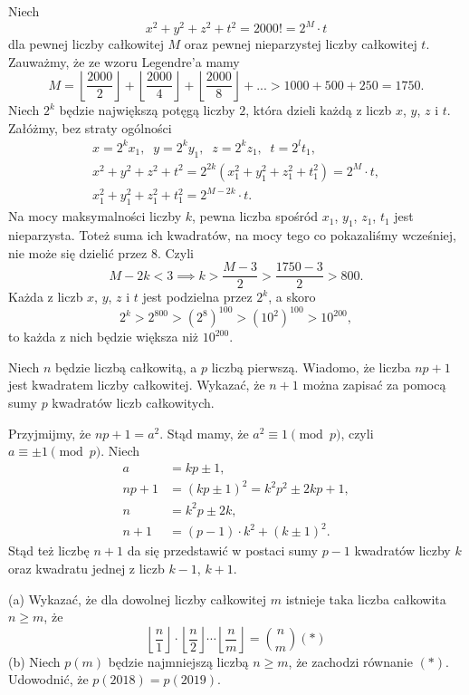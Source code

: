 \vspace{10px}
\noindent
Niech
\[
	x^2 + y^2 + z^2 + t^2 = 2000! = 2^M \cdot t
\]
dla pewnej liczby całkowitej $M$ oraz pewnej nieparzystej liczby całkowitej $t$. Zauważmy, że ze wzoru Legendre'a mamy
\[
	M = \left\lfloor \frac{2000}{2} \right\rfloor + \left\lfloor \frac{2000}{4} \right\rfloor + \left\lfloor \frac{2000}{8} \right\rfloor + ... > 1000 + 500 + 250 = 1750.
\]
Niech $2^k$ będzie największą potęgą liczby $2$, która dzieli każdą z liczb $x$, $y$, $z$ i $t$. Załóżmy, bez straty ogólności
\begin{gather*}
	x = 2^{k}x_1, \;\; y = 2^{k}y_1, \;\; z = 2^{k}z_1, \;\; t = 2^{l}t_1, \\
	x^2 + y^2 + z^2 + t^2 = 2^{2k} \left(x_1^2 + y_1^2 + z_1^2 + t_1^2\right) = 2^M \cdot t, \\
	x_1^2 + y_1^2 + z_1^2 + t_1^2 = 2^{M - 2k} \cdot t.
\end{gather*}
Na mocy maksymalności liczby $k$, pewna liczba spośród $x_1$, $y_1$, $z_1$, $t_1$ jest nieparzysta. Toteż suma ich kwadratów, na mocy tego co pokazaliśmy wcześniej, nie może się dzielić przez $8$. Czyli
\[
 M - 2k < 3 \implies k > \frac{M - 3}{2} > \frac{1750 - 3}{2} > 800.
\]
Każda z liczb $x$, $y$, $z$ i $t$ jest podzielna przez $2^{k}$, a skoro
\[
	2^k > 2^{800} > \left(2^{8}\right)^{100} > \left(10^{2}\right)^{100} > 10^{200},
\]
to każda z nich będzie większa niż $10^{200}$.
\vspace{5px}

\begin{problem}{5}
	Niech $n$ będzie liczbą całkowitą, a $p$ liczbą pierwszą. Wiadomo, że liczba $np + 1$ jest kwadratem liczby całkowitej. Wykazać, że $n + 1$ można zapisać za pomocą sumy $p$ kwadratów liczb całkowitych.
\end{problem}

\noindent
Przyjmijmy, że $np + 1 = a^2$. Stąd mamy, że $a^2 \equiv 1 \pmod{p}$, czyli $a \equiv \pm 1 \pmod{p}$. Niech
\begin{align*}
	a &= kp \pm 1, \\
	np + 1 &= (kp \pm 1)^2 = k^2p^2 \pm 2kp + 1, \\
	n &= k^2p \pm 2k, \\
	n + 1 &= (p - 1) \cdot k^2 + (k \pm 1)^2.
\end{align*}
Stąd też liczbę $n + 1$ da się przedstawić w postaci sumy $p - 1$ kwadratów liczby $k$ oraz kwadratu jednej z liczb $k - 1$, $k + 1$.
\vspace{5px}

\begin{problem}{6}
	(a) Wykazać, że dla dowolnej liczby całkowitej $m$ istnieje taka liczba całkowita $n \geqslant m$, że
\[
	\left \lfloor \frac{n}{1} \right \rfloor \cdot \left \lfloor \frac{n}{2} \right \rfloor \cdots \left \lfloor \frac{n}{m} \right \rfloor = \binom{n}{m}         (*)
\]
(b) Niech $p(m)$ będzie najmniejszą liczbą $n \geqslant m$, że zachodzi równanie  $(*)$. Udowodnić, że $p(2018) = p(2019).$
\end{problem}

